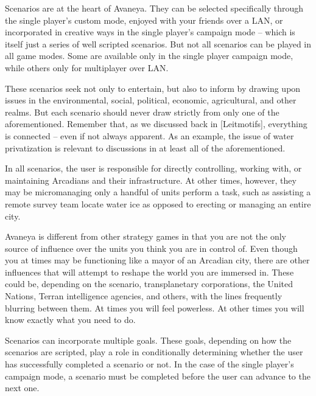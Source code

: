 

Scenarios are at the heart of Avaneya. They can be selected specifically through the single player's custom mode, enjoyed with your friends over a LAN, or incorporated in creative ways in the single player's campaign mode -- which is itself just a series of well scripted scenarios. But not all scenarios can be played in all game modes. Some are available only in the single player campaign mode, while others only for multiplayer over LAN.

These scenarios seek not only to entertain, but also to inform by drawing upon issues in the environmental, social, political, economic, agricultural, and other realms. But each scenario should never draw strictly from only one of the aforementioned. Remember that, as we discussed back in [Leitmotifs], everything is connected -- even if not always apparent. As an example, the issue of water privatization is relevant to discussions in at least all of the aforementioned.

In all scenarios, the user is responsible for directly controlling, working with, or maintaining Arcadians and their infrastructure. At other times, however, they may be micromanaging only a handful of units perform a task, such as assisting a remote survey team locate water ice as opposed to erecting or managing an entire city.

Avaneya is different from other strategy games in that you are not the only source of influence over the units you think you are in control of. Even though you at times may be functioning like a mayor of an Arcadian city, there are other influences that will attempt to reshape the world you are immersed in. These could be, depending on the scenario, transplanetary corporations, the United Nations, Terran intelligence agencies, and others, with the lines frequently blurring between them. At times you will feel powerless. At other times you will know exactly what you need to do.

Scenarios can incorporate multiple goals. These goals, depending on how the scenarios are scripted, play a role in conditionally determining whether the user has successfully completed a scenario or not. In the case of the single player's campaign mode, a scenario must be completed before the user can advance to the next one.


